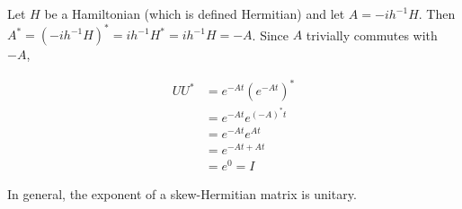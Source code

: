 \par Let $H$ be a Hamiltonian (which is defined Hermitian) and let $A = -i
h^{-1} H$. Then $A^* = (-i h^{-1} H)^* = i h^{-1} H^* = i h^{-1} H = -A$. Since
$A$ trivially commutes with $-A$,

\begin{align}
U U^* &= e^{-A t} \left( e^{-A t} \right)^* \\
&= e^{-A t} e^{(-A)^* t} \\
&= e^{-A t} e^{A t} \\
&= e^{-A t + A t} \\
&= e^0 = I
\end{align}

In general, the exponent of a skew-Hermitian matrix is unitary.
